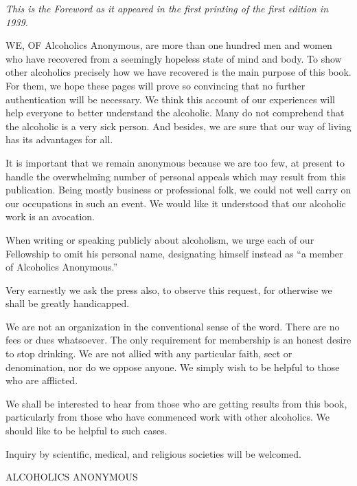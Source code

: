 
\bbChapterPreamble


\begin{biblechapter}
    \emph{This is the Foreword as it appeared in the first 
    printing of the first edition in 1939.}

WE, OF Alcoholics Anonymous, 
    are more than one hundred men and women 
    who have recovered from a seemingly hopeless state 
    of mind and body. 
\verse To show other alcoholics precisely how we have recovered 
    is the main purpose of this book. 
\verse For them, we hope these pages will prove so convincing 
    that no further authentication will be necessary. 
\verse We think this account of our experiences will help everyone 
    to better understand the alcoholic. 
\verse Many do not comprehend that the alcoholic is a very sick person.
\verse And besides, 
    we are sure that our way of living has its advantages for all. 

    It is important that we remain anonymous 
    because we are too few, at present 
    to handle the overwhelming number of personal appeals 
    which may result from this publication. 
\verse Being mostly business or professional folk, 
    we could not well carry on our occupations in such an event. 
\verse We would like it understood that our alcoholic work is an avocation. 

\verse When writing or speaking publicly about alcoholism, 
    we urge each of our Fellowship to omit his personal name, 
    designating himself instead as 
    “a member of Alcoholics Anonymous.”

    Very earnestly we ask the press also, 
    to observe this request, 
    for otherwise we shall be greatly handicapped.

    We are not an organization in the conventional sense of the word.
\verse There are no fees or dues whatsoever. 
\verse The only requirement for membership is an honest desire to stop drinking. 
\verse We are not allied with any particular faith, sect or denomination, 
    nor do we oppose anyone.
\verse We simply wish to be helpful to those who are afflicted. 

    We shall be interested to hear from those 
    who are getting results from this book, 
    particularly from those who have commenced work with other alcoholics.
\verse We should like to be helpful to such cases. 

\verse Inquiry by scientific, medical, and religious societies 
    will be welcomed. 

\verse ALCOHOLICS ANONYMOUS
\end{biblechapter}

